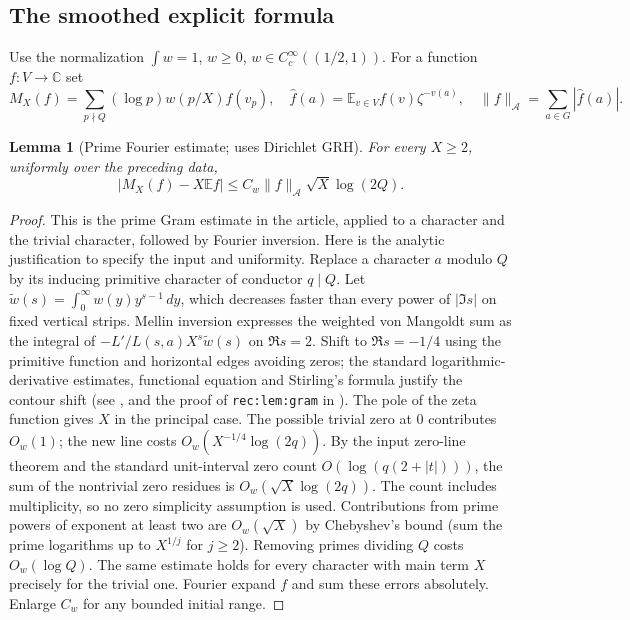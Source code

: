 \documentclass[11pt]{article}
\newtheorem{lemma}[theorem]{Lemma}
\theoremstyle{remark}\newtheorem{remark}[theorem]{Remark}
\newcommand{\E}{\mathbb E}
\newcommand{\C}{\mathbb C}
\newcommand{\normA}[1]{\lVert #1\rVert_{\mathcal A}}
\begin{document}
\subsection{The smoothed explicit formula}
Use the normalization $\int w=1$, $w\ge0$, $w\in C_c^\infty((1/2,1))$. For a function $f:V\to\C$ set
\[
 M_X(f)=\sum_{p\nmid Q}(\log p)w(p/X)f(v_p),\quad
 \widehat f(a)=\E_{v\in V}f(v)\zeta^{-v(a)},\quad
 \normA f=\sum_{a\in G}|\widehat f(a)|.
\]
\begin{lemma}[Prime Fourier estimate; uses Dirichlet GRH]\label{lem:gram}
For every $X\ge2$, uniformly over the preceding data,
\begin{equation}\label{eq:prime-est}
 |M_X(f)-X\E f|\le C_w\normA f\sqrt X\log(2Q).
\end{equation}
\end{lemma}
\begin{proof}
This is the prime Gram estimate in the article, applied to a character and the trivial character, followed by Fourier inversion. Here is the analytic justification to specify the input and uniformity. Replace a character $a$ modulo $Q$ by its inducing primitive character of conductor $q\mid Q$. Let $\widetilde w(s)=\int_0^\infty w(y)y^{s-1}\,dy$, which decreases faster than every power of $|\Im s|$ on fixed vertical strips. Mellin inversion expresses the weighted von Mangoldt sum as the integral of $-L'/L(s,a)X^s\widetilde w(s)$ on $\Re s=2$. Shift to $\Re s=-1/4$ using the primitive function and horizontal edges avoiding zeros; the standard logarithmic-derivative estimates, functional equation and Stirling's formula justify the contour shift (see \cite{davenport}, and the proof of \texttt{rec:lem:gram} in \cite{article}). The pole of the zeta function gives $X$ in the principal case. The possible trivial zero at $0$ contributes $O_w(1)$; the new line costs $O_w(X^{-1/4}\log(2q))$. By the input zero-line theorem and the standard unit-interval zero count $O(\log(q(2+|t|)))$, the sum of the nontrivial zero residues is $O_w(\sqrt X\log(2q))$. The count includes multiplicity, so no zero simplicity assumption is used. Contributions from prime powers of exponent at least two are $O_w(\sqrt X)$ by Chebyshev's bound (sum the prime logarithms up to $X^{1/j}$ for $j\ge2$). Removing primes dividing $Q$ costs $O_w(\log Q)$. The same estimate holds for every character with main term $X$ precisely for the trivial one. Fourier expand $f$ and sum these errors absolutely. Enlarge $C_w$ for any bounded initial range.
\end{proof}
\end{document}
